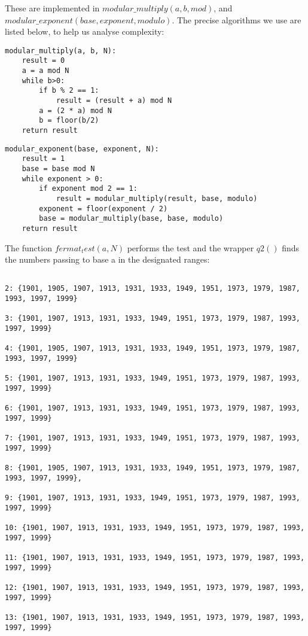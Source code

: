 \documentclass[10pt,a4paper]{report}
\begin{document}
These are implemented in $modular\_multiply(a,b,mod)$, and \\ $modular\_exponent(base,exponent,modulo)$. The precise algorithms we use are listed below, to help us analyse complexity:

\begin{verbatim}
modular_multiply(a, b, N):
    result = 0 
    a = a mod N
    while b>0:
        if b % 2 == 1:
            result = (result + a) mod N
        a = (2 * a) mod N
        b = floor(b/2)
    return result

\end{verbatim}

\begin{verbatim}
modular_exponent(base, exponent, N):
    result = 1
    base = base mod N
    while exponent > 0:
        if exponent mod 2 == 1:
            result = modular_multiply(result, base, modulo)
        exponent = floor(exponent / 2)
        base = modular_multiply(base, base, modulo)
    return result
\end{verbatim}    

The function $fermat_test(a, N)$ performs the test and the wrapper $q2()$ finds the numbers passing to base a in the designated ranges:

\begin{lstlisting}[breaklines]

2: {1901, 1905, 1907, 1913, 1931, 1933, 1949, 1951, 1973, 1979, 1987, 1993, 1997, 1999}

3: {1901, 1907, 1913, 1931, 1933, 1949, 1951, 1973, 1979, 1987, 1993, 1997, 1999}

4: {1901, 1905, 1907, 1913, 1931, 1933, 1949, 1951, 1973, 1979, 1987, 1993, 1997, 1999}

5: {1901, 1907, 1913, 1931, 1933, 1949, 1951, 1973, 1979, 1987, 1993, 1997, 1999}

6: {1901, 1907, 1913, 1931, 1933, 1949, 1951, 1973, 1979, 1987, 1993, 1997, 1999}

7: {1901, 1907, 1913, 1931, 1933, 1949, 1951, 1973, 1979, 1987, 1993, 1997, 1999}
 
8: {1901, 1905, 1907, 1913, 1931, 1933, 1949, 1951, 1973, 1979, 1987, 1993, 1997, 1999}, 
 
9: {1901, 1907, 1913, 1931, 1933, 1949, 1951, 1973, 1979, 1987, 1993, 1997, 1999}
 
10: {1901, 1907, 1913, 1931, 1933, 1949, 1951, 1973, 1979, 1987, 1993, 1997, 1999}
 
11: {1901, 1907, 1913, 1931, 1933, 1949, 1951, 1973, 1979, 1987, 1993, 1997, 1999}
 
12: {1901, 1907, 1913, 1931, 1933, 1949, 1951, 1973, 1979, 1987, 1993, 1997, 1999}
 
13: {1901, 1907, 1913, 1931, 1933, 1949, 1951, 1973, 1979, 1987, 1993, 1997, 1999}
 
\end{lstlisting}
\end{document}
